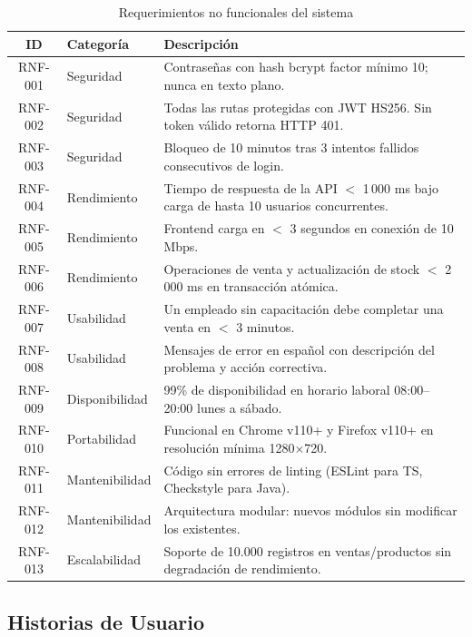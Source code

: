 \documentclass[12pt, letterpaper]{report}
\begin{document}
\begin{table}[H]
\centering
\caption{Requerimientos no funcionales del sistema}
\label{tab:rnf}
\renewcommand{\arraystretch}{1.3}
\begin{tabularx}{\textwidth}{|c|l|X|}
\hline
\textbf{ID} & \textbf{Categoría} & \textbf{Descripción} \\ \hline
RNF-001 & Seguridad & Contraseñas con hash bcrypt factor mínimo 10; nunca en texto plano. \\ \hline
RNF-002 & Seguridad & Todas las rutas protegidas con JWT HS256. Sin token válido retorna HTTP 401. \\ \hline
RNF-003 & Seguridad & Bloqueo de 10 minutos tras 3 intentos fallidos consecutivos de login. \\ \hline
RNF-004 & Rendimiento & Tiempo de respuesta de la API $<$ 1\,000 ms bajo carga de hasta 10 usuarios concurrentes. \\ \hline
RNF-005 & Rendimiento & Frontend carga en $<$ 3 segundos en conexión de 10 Mbps. \\ \hline
RNF-006 & Rendimiento & Operaciones de venta y actualización de stock $<$ 2\,000 ms en transacción atómica. \\ \hline
RNF-007 & Usabilidad & Un empleado sin capacitación debe completar una venta en $<$ 3 minutos. \\ \hline
RNF-008 & Usabilidad & Mensajes de error en español con descripción del problema y acción correctiva. \\ \hline
RNF-009 & Disponibilidad & 99\% de disponibilidad en horario laboral 08:00--20:00 lunes a sábado. \\ \hline
RNF-010 & Portabilidad & Funcional en Chrome v110+ y Firefox v110+ en resolución mínima 1280$\times$720. \\ \hline
RNF-011 & Mantenibilidad & Código sin errores de linting (ESLint para TS, Checkstyle para Java). \\ \hline
RNF-012 & Mantenibilidad & Arquitectura modular: nuevos módulos sin modificar los existentes. \\ \hline
RNF-013 & Escalabilidad & Soporte de 10.000 registros en ventas/productos sin degradación de rendimiento. \\ \hline
\end{tabularx}
\end{table}

\subsection{Historias de Usuario}
\end{document}
